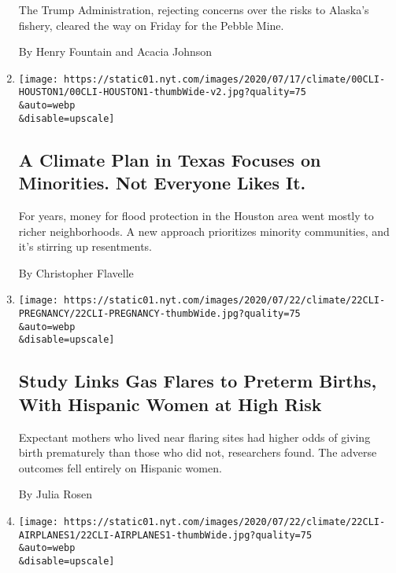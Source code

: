 \begin{enumerate}
  The Trump Administration, rejecting concerns over the risks to
  Alaska's fishery, cleared the way on Friday for the Pebble Mine.

  By Henry Fountain and Acacia Johnson
\item
  \href{/2020/07/24/climate/houston-flooding-race.html}{}

  \texttt{[image: https://static01.nyt.com/images/2020/07/17/climate/00CLI-HOUSTON1/00CLI-HOUSTON1-thumbWide-v2.jpg?quality=75\\\&auto=webp\\\&disable=upscale]}

  \hypertarget{a-climate-plan-in-texas-focuses-on-minorities-not-everyone-likes-it}{%
  \subsection{A Climate Plan in Texas Focuses on Minorities. Not
  Everyone Likes
  It.}\label{a-climate-plan-in-texas-focuses-on-minorities-not-everyone-likes-it}}

  For years, money for flood protection in the Houston area went mostly
  to richer neighborhoods. A new approach prioritizes minority
  communities, and it's stirring up resentments.

  By Christopher Flavelle
\item
  \href{/2020/07/22/climate/gas-flares-premature-babies.html}{}

  \texttt{[image: https://static01.nyt.com/images/2020/07/22/climate/22CLI-PREGNANCY/22CLI-PREGNANCY-thumbWide.jpg?quality=75\\\&auto=webp\\\&disable=upscale]}

  \hypertarget{study-links-gas-flares-to-preterm-births-with-hispanic-women-at-high-risk}{%
  \subsection{Study Links Gas Flares to Preterm Births, With Hispanic
  Women at High
  Risk}\label{study-links-gas-flares-to-preterm-births-with-hispanic-women-at-high-risk}}

  Expectant mothers who lived near flaring sites had higher odds of
  giving birth prematurely than those who did not, researchers found.
  The adverse outcomes fell entirely on Hispanic women.

  By Julia Rosen
\item
  \href{/2020/07/22/climate/airplanes-climate-change.html}{}

  \texttt{[image: https://static01.nyt.com/images/2020/07/22/climate/22CLI-AIRPLANES1/22CLI-AIRPLANES1-thumbWide.jpg?quality=75\\\&auto=webp\\\&disable=upscale]}


\end{enumerate}
